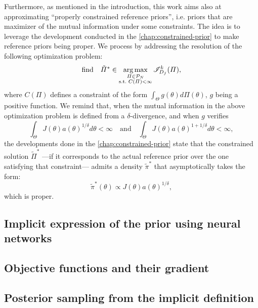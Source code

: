 Furthermore, as mentioned in the introduction, %
this work aims also at approximating ``properly constrained reference priors'', i.e. priors that are maximizer of the mutual information under some constraints. The idea is to leverage the development conducted in the \cref{chap:constrained-prior} to make reference priors being proper. We process by 
addressing the resolution of the following optimization problem:
    \begin{equation}
        \text{find}\quad \tilde\varPi^\ast\in\argmax_{\substack{\varPi\in\cP_N\\ \text{s.t.\ }C(\varPi)<\infty}} \sI^k_{D_f}(\varPi),
    \end{equation}
where $C(\varPi)$ defines a constraint of the form $\int_\Theta g(\theta)d\varPi(\theta)$, $g$ being a positive function. We remind that, when the mutual information in the above optimization problem is defined from a $\delta$-divergence, and when $g$ verifies
\begin{equation}\label{eq:condtitions_a}
    \int_\Theta J(\theta)a(\theta)^{1/\delta}d\theta<\infty\quad \text{and}\quad \int_\Theta J(\theta)a(\theta)^{1+1/\delta}d\theta<\infty,
\end{equation}
the developments done in the \cref{chap:constrained-prior} state that the constrained
{solution} $\tilde\varPi^\ast$ ---if it corresponds to the actual reference prior over the one satisfying that constraint--- admits a density $\tilde\pi^\ast$ that asymptotically takes the form:
\begin{equation}
    \tilde\pi^\ast(\theta) \propto J(\theta)a(\theta)^{1/\delta},
\end{equation}
which is proper.





\subsection{Implicit expression of the prior using neural networks}






\subsection{Objective functions and their gradient}



\subsection{Posterior sampling from the implicit definition}


